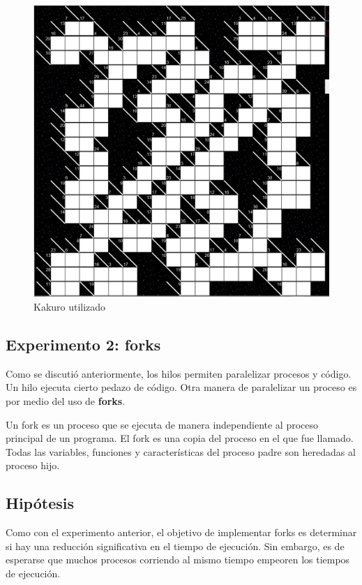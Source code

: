 \documentclass[conference]{IEEEtran}
\begin{document}
\begin{figure}
	\includegraphics[scale=0.3]{kakuroHardPhoto.png}
	\caption{Kakuro utilizado}
\end{figure}

\newpage
\subsection{Experimento 2: forks}

    Como se discutió anteriormente, los hilos permiten paralelizar procesos y código. Un hilo ejecuta cierto pedazo de código. Otra manera de paralelizar un proceso es por medio del uso de \textbf{forks}.\newline
    
    Un fork es un proceso que se ejecuta de manera independiente al proceso principal de un programa. El fork es una copia del proceso en el que fue llamado. Todas las variables, funciones y características del proceso padre son heredadas al proceso hijo.\newline
    
\subsection*{Hipótesis}

    Como con el experimento anterior, el objetivo de implementar forks es determinar si hay una reducción significativa en el tiempo de ejecución. Sin embargo, es de esperarse que muchos procesos corriendo al mismo tiempo empeoren los tiempos de ejecución. \newline
    
\end{document}
